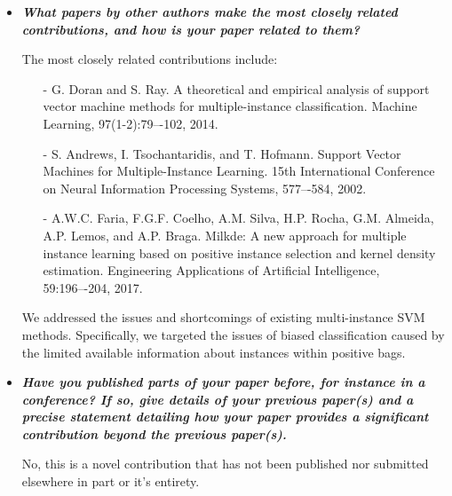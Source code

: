 \documentclass[a4paper,notitlepage]{article}
\begin{document}
\begin{itemize}
\item \textbf{\textit{What papers by other authors make the most closely related contributions, and how is your paper related to them?}}

The most closely related contributions include:
\begin{itemize}
\item[-] G. Doran and S. Ray. A theoretical and empirical analysis of support vector machine methods for multiple-instance classification. Machine Learning, 97(1-2):79–-102, 2014.
\item[-] S. Andrews, I. Tsochantaridis, and T. Hofmann. Support Vector Machines for Multiple-Instance Learning. 15th International Conference on Neural Information Processing Systems,  577–-584, 2002.
\item[-] A.W.C. Faria, F.G.F. Coelho, A.M. Silva, H.P. Rocha, G.M. Almeida, A.P. Lemos, and A.P. Braga. Milkde: A new approach for multiple instance learning based on positive instance selection and kernel density estimation. Engineering Applications of Artiﬁcial Intelligence, 59:196–-204, 2017.
\end{itemize}

We addressed the issues and shortcomings of existing multi-instance SVM methods. Specifically, we targeted the issues of biased classification caused by the limited available information about instances within positive bags. 

\item \textbf{\textit{Have you published parts of your paper before, for instance in a conference? If so, give details of your previous paper(s) and a precise statement detailing how your paper provides a significant contribution beyond the previous paper(s).}}

No, this is a novel contribution that has not been published nor submitted elsewhere in part or it's entirety.
\end{itemize}

\end{document}
